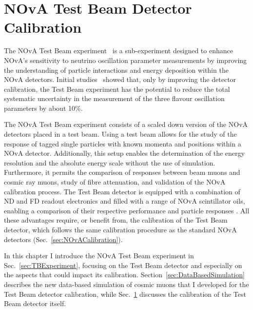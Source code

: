 \chapter{NOvA Test Beam Detector Calibration}\label{sec:TestBeamCalibration}

The \gls{NOvA} Test Beam experiment~\cite{NOvATestBeamWallbangProceedings2020.pdf} is a sub-experiment designed to enhance \gls{NOvA}'s sensitivity to neutrino oscillation parameter measurements by improving the understanding of particle interactions and energy deposition within the \gls{NOvA} detectors. Initial studies~\cite{NOvA-doc-33012} showed that, only by improving the detector calibration, the Test Beam experiment has the potential to reduce the total systematic uncertainty in the measurement of the three flavour oscillation parameters by about 10\%.
 
The \gls{NOvA} Test Beam experiment consists of a scaled down version of the \gls{NOvA} detectors placed in a test beam. Using a test beam allows for the study of the response of tagged single particles with known momenta and positions within a \gls{NOvA} detector. Additionally, this setup enables the determination of the energy resolution and the absolute energy scale without the use of simulation. Furthermore, it permits the comparison of responses between beam muons and cosmic ray muons, study of fibre attenuation, and validation of the \gls{NOvA} calibration process. The Test Beam detector is equipped with a combination of \gls{ND} and \gls{FD} readout electronics and filled with a range of \gls{NOvA} scintillator oils, enabling a comparison of their respective performance and particle responses \cite{NOvA-doc-15750}. All these advantages require, or benefit from, the calibration of the Test Beam detector, which follows the same calibration procedure as the standard \gls{NOvA} detectors (Sec.~\ref{sec:NOvACalibration}).

In this chapter I introduce the \gls{NOvA} Test Beam experiment in Sec.~\ref{sec:TBExperiment}, focusing on the Test Beam detector and especially on the aspects that could impact its calibration. Section~\ref{sec:DataBasedSimulation} describes the new data-based simulation of cosmic muons that I developed for the Test Beam detector calibration, while Sec.~\ref{sec:TestBeamCalibration} discusses the calibration of the Test Beam detector itself.

